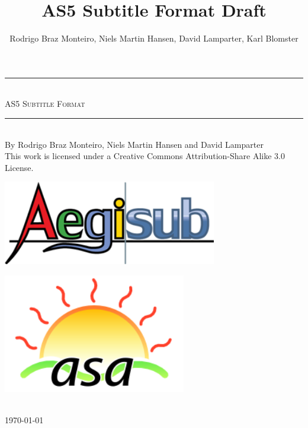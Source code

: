 \documentclass{spec}
\newcommand{\HRule}{\rule{\linewidth}{0.5mm}}
\begin{document}
\title{AS5 Subtitle Format Draft}
\author{Rodrigo Braz Monteiro, Niels Martin Hansen, David Lamparter, Karl Blomster}

\begin{titlepage}
\begin{center}

\vspace*{3cm}

\HRule \\[0.5cm]
\textsc{\huge AS5 Subtitle Format}\\
\HRule \\[1.1cm]
{\large By Rodrigo Braz Monteiro, Niels Martin Hansen and David Lamparter}\\[0.3cm]
This work is licensed under a Creative Commons Attribution-Share Alike 3.0 License.\\
\vfill

\begin{minipage}{0.4\textwidth}
\begin{flushleft} \large
\includegraphics[width=0.7\textwidth]{./aegisub}
\end{flushleft}
\end{minipage}
\begin{minipage}{0.4\textwidth}
\begin{flushright} \large
\includegraphics[width=0.6\textwidth]{./asa}
\end{flushright}
\end{minipage}\\[1.5cm]

{\large \today}

\end{center}
\end{titlepage}
\end{document}
